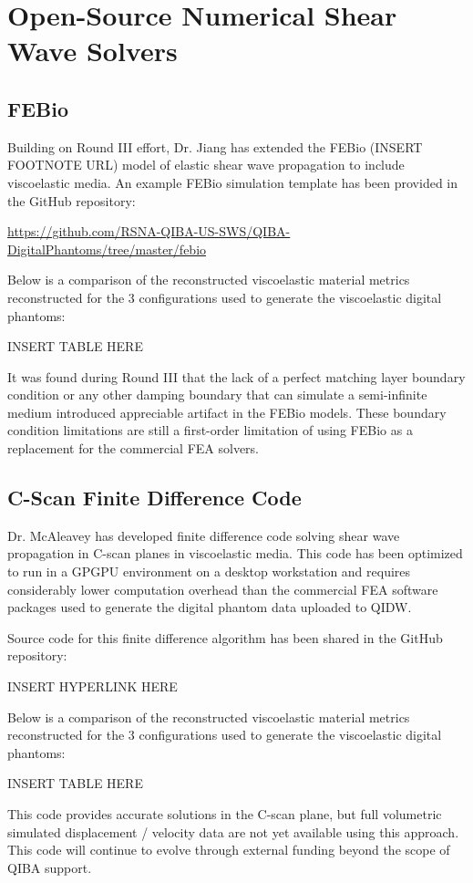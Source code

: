 \section{Open-Source Numerical Shear Wave Solvers}\label{sect:open_source}

\subsection{FEBio}
Building on Round III effort, Dr. Jiang has extended the FEBio (INSERT FOOTNOTE
URL) model of elastic shear wave propagation to include viscoelastic media.  An
example FEBio simulation template has been provided in the GitHub repository:

\url{https://github.com/RSNA-QIBA-US-SWS/QIBA-DigitalPhantoms/tree/master/febio}

Below is a comparison of the reconstructed viscoelastic material metrics
reconstructed for the 3 configurations used to generate the viscoelastic
digital phantoms:

INSERT TABLE HERE

It was found during Round III that the lack of a perfect matching layer
boundary condition or any other damping boundary that can simulate a
semi-infinite medium introduced appreciable artifact in the FEBio models.
These boundary condition limitations are still a first-order limitation of
using FEBio as a replacement for the commercial FEA solvers.

\subsection{C-Scan Finite Difference Code}
Dr. McAleavey has developed finite difference code solving shear wave
propagation in C-scan planes in viscoelastic media.  This code has been
optimized to run in a GPGPU environment on a desktop workstation and requires
considerably lower computation overhead than the commercial FEA software
packages used to generate the digital phantom data uploaded to QIDW.

Source code for this finite difference algorithm has been shared in the GitHub
repository:

INSERT HYPERLINK HERE

Below is a comparison of the reconstructed viscoelastic material metrics
reconstructed for the 3 configurations used to generate the viscoelastic
digital phantoms:

INSERT TABLE HERE

This code provides accurate solutions in the C-scan plane, but full volumetric
simulated displacement / velocity data are not yet available using this
approach.  This code will continue to evolve through external funding beyond
the scope of QIBA support.

